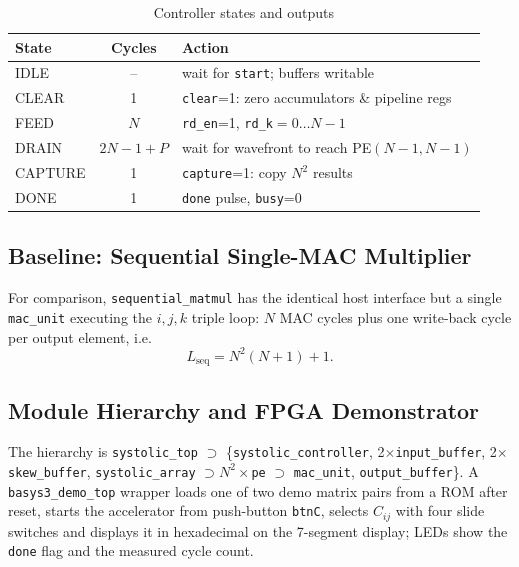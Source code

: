 \documentclass[conference]{IEEEtran}
\begin{document}
\begin{table}[t]
\centering
\caption{Controller states and outputs}
\label{tab:fsm}
\setlength{\tabcolsep}{3pt}
\begin{tabular}{@{}lcl@{}}
\toprule
State & Cycles & Action \\
\midrule
IDLE    & --        & wait for \texttt{start}; buffers writable \\
CLEAR   & 1         & \texttt{clear}=1: zero accumulators \& pipeline regs \\
FEED    & $N$       & \texttt{rd\_en}=1, \texttt{rd\_k}$=0\ldots N{-}1$ \\
DRAIN   & $2N{-}1{+}P$ & wait for wavefront to reach PE$(N{-}1,N{-}1)$ \\
CAPTURE & 1         & \texttt{capture}=1: copy $N^2$ results \\
DONE    & 1         & \texttt{done} pulse, \texttt{busy}=0 \\
\bottomrule
\end{tabular}
\end{table}

\subsection{Baseline: Sequential Single-MAC Multiplier}
For comparison, \texttt{sequential\_matmul} has the identical host interface
but a single \texttt{mac\_unit} executing the $i,j,k$ triple loop: $N$ MAC
cycles plus one write-back cycle per output element, i.e.
\begin{equation}
L_{\text{seq}} = N^2(N+1)+1 .\label{eq:lseq}
\end{equation}

\subsection{Module Hierarchy and FPGA Demonstrator}
The hierarchy is \texttt{systolic\_top} $\supset$ \{\texttt{systolic\_controller},
2$\times$\texttt{input\_buffer}, 2$\times$\texttt{skew\_buffer},
\texttt{systolic\_array} $\supset N^2\times$\texttt{pe} $\supset$
\texttt{mac\_unit}, \texttt{output\_buffer}\}. A \texttt{basys3\_demo\_top}
wrapper loads one of two demo matrix pairs from a ROM after reset, starts the
accelerator from push-button \texttt{btnC}, selects $C_{ij}$ with four slide
switches and displays it in hexadecimal on the 7-segment display; LEDs show the
\texttt{done} flag and the measured cycle count.

\end{document}
